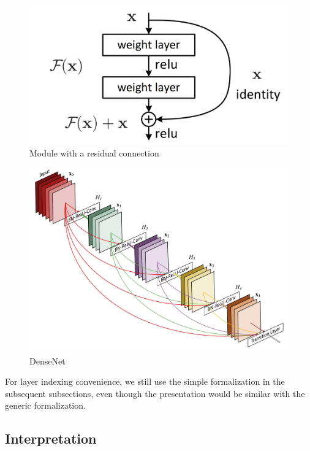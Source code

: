 \begin{figure}[tp]
\centering\includegraphics[scale=0.2]{chapter1/resnetmodule.png}
\caption{Module with a residual connection \citep{he2016deep}}
\label{fig:resnet}
\end{figure}

\begin{figure}[tp]
\centering\includegraphics[scale=0.07]{chapter1/densenet.jpg}
\caption{DenseNet \citep{huang2017densely}}
\label{fig:densenet}
\end{figure}

\begin{remark}
For layer indexing convenience, we still use the simple formalization in the subsequent subsections, even though the presentation would be similar with the generic formalization.
\end{remark}

\subsection{Interpretation}

